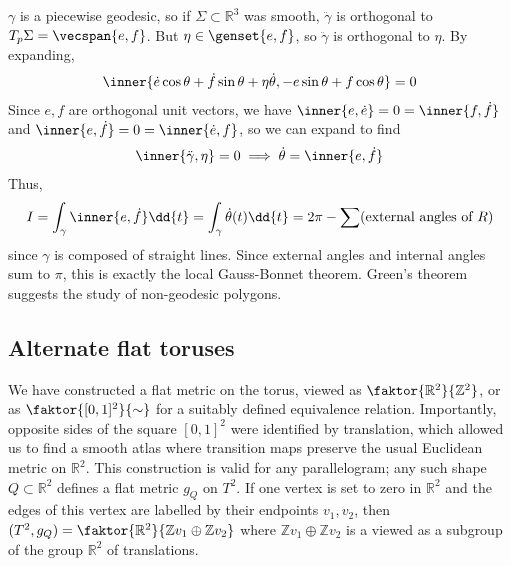 $\gamma$ is a piecewise geodesic, so if $\Sigma \subset \mathbb R^3$ was smooth, $\ddot \gamma$ is orthogonal to $T_p \Sigma = \vecspan{e,f}$.
But $\eta \in \genset{e,f}$, so $\ddot \gamma$ is orthogonal to $\eta$.
By expanding,
\begin{align*}
	\inner{\dot e \cos \theta + \dot f \sin \theta + \eta \dot \theta, -e\sin\theta + f\cos \theta} = 0
\end{align*}
Since $e, f$ are orthogonal unit vectors, we have $\inner{e,\dot e} = 0 = \inner{f,\dot f}$ and $\inner{e,\dot f} = 0 = \inner{\dot e, f}$, so we can expand to find
\begin{align*}
	\inner{\ddot \gamma,\eta} = 0 \implies \dot \theta = \inner{e,\dot f}
\end{align*}
Thus,
\begin{align*}
	I = \int_\gamma \inner{e,\dot f} \dd{t} = \int_\gamma \dot \theta(t) \dd{t} = 2\pi - \sum(\text{external angles of } R)
\end{align*}
since $\gamma$ is composed of straight lines.
Since external angles and internal angles sum to $\pi$, this is exactly the local Gauss-Bonnet theorem.
Green's theorem suggests the study of non-geodesic polygons.

\subsection{Alternate flat toruses}
We have constructed a flat metric on the torus, viewed as $\faktor{\mathbb R^2}{\mathbb Z^2}$, or as $\faktor{[0,1]^2}{\sim}$ for a suitably defined equivalence relation.
Importantly, opposite sides of the square $[0,1]^2$ were identified by translation, which allowed us to find a smooth atlas where transition maps preserve the usual Euclidean metric on $\mathbb R^2$.
This construction is valid for any parallelogram; any such shape $Q \subset \mathbb R^2$ defines a flat metric $g_Q$ on $T^2$.
If one vertex is set to zero in $\mathbb R^2$ and the edges of this vertex are labelled by their endpoints $v_1, v_2$, then $(T^2, g_Q) = \faktor{\mathbb R^2}{\mathbb Z v_1 \oplus \mathbb Z v_2}$ where $\mathbb Z v_1 \oplus \mathbb Z v_2$ is a viewed as a subgroup of the group $\mathbb R^2$ of translations.

